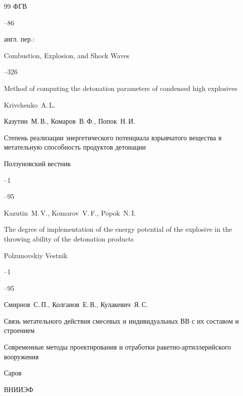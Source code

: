 \begin{thebibliography}{99}
\jour ФГВ




--86

\transl англ. пер.:~

\jour Combustion, Explosion, and Shock Waves



--326


\paper Method of computing the detonation parameters of condensed high explosives

\by Krivchenko~A.\,L. 








\by Казутин~М.\,В., Комаров~В.\,Ф., Попок~Н.\,И.

\paper Степень реализации энергетического потенциала взрывчатого вещества в метательную способность продуктов детонации

\jour Ползуновский вестник

--1


--95

\misctransl

\by Kazutin~M.\,V., Komarov~V.\,F., Popok~N.\,I.

\paper The degree of implementation of the energy potential of the explosive in the throwing ability of the detonation products

\jour Polzunovskiy Vestnik

--1


--95






\by Смирнов~С.\,П., Колганов~Е.\,В., Кулакевич~Я.\,С.

\paper Связь метательного действия смесевых и индивидуальных ВВ с их составом и строением

\inbook Современные методы проектирования и отработки ракетно-артиллерийского вооружения

\publaddr Саров

\publ ВНИИЭФ


\end{thebibliography}

